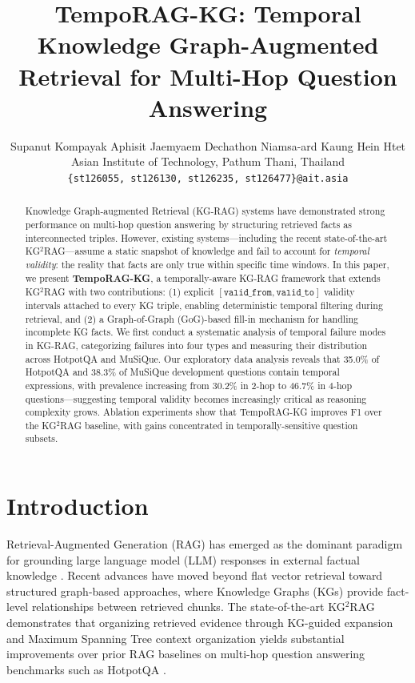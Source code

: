 \documentclass[11pt]{article}
\title{TempoRAG-KG: Temporal Knowledge Graph-Augmented\\
Retrieval for Multi-Hop Question Answering}
\author{
  Supanut Kompayak \quad Aphisit Jaemyaem \quad Dechathon Niamsa-ard \quad Kaung Hein Htet \\
  Asian Institute of Technology, Pathum Thani, Thailand \\
  \texttt{\{st126055, st126130, st126235, st126477\}@ait.asia}
}
\begin{document}
\maketitle

\begin{abstract}
Knowledge Graph-augmented Retrieval (KG-RAG) systems have demonstrated
strong performance on multi-hop question answering by structuring retrieved
facts as interconnected triples. However, existing systems---including the
recent state-of-the-art KG$^2$RAG---assume a static snapshot of knowledge
and fail to account for \textit{temporal validity}: the reality that facts
are only true within specific time windows. In this paper, we present
\textbf{TempoRAG-KG}, a temporally-aware KG-RAG framework that extends
KG$^2$RAG with two contributions: (1) explicit $[\mathtt{valid\_from},
\mathtt{valid\_to}]$ validity intervals attached to every KG triple,
enabling deterministic temporal filtering during retrieval, and (2) a
Graph-of-Graph (GoG)-based fill-in mechanism for handling incomplete KG
facts. We first conduct a systematic analysis of temporal failure modes in
KG-RAG, categorizing failures into four types and measuring their
distribution across HotpotQA and MuSiQue. Our exploratory data analysis
reveals that 35.0\% of HotpotQA and 38.3\% of MuSiQue development
questions contain temporal expressions, with prevalence increasing from
30.2\% in 2-hop to 46.7\% in 4-hop questions---suggesting temporal validity
becomes increasingly critical as reasoning complexity grows. Ablation
experiments show that TempoRAG-KG improves F1 over the KG$^2$RAG baseline,
with gains concentrated in temporally-sensitive question subsets.
\end{abstract}

\section{Introduction}

Retrieval-Augmented Generation (RAG) has emerged as the dominant paradigm
for grounding large language model (LLM) responses in external factual
knowledge \cite{lewis2020retrieval}. Recent advances have moved beyond
flat vector retrieval toward structured graph-based approaches, where
Knowledge Graphs (KGs) provide fact-level relationships between retrieved
chunks. The state-of-the-art KG$^2$RAG \cite{zhu2025kg2rag} demonstrates
that organizing retrieved evidence through KG-guided expansion and Maximum
Spanning Tree context organization yields substantial improvements over
prior RAG baselines on multi-hop question answering benchmarks such as
HotpotQA \cite{yang2018hotpotqa}.
\end{document}
